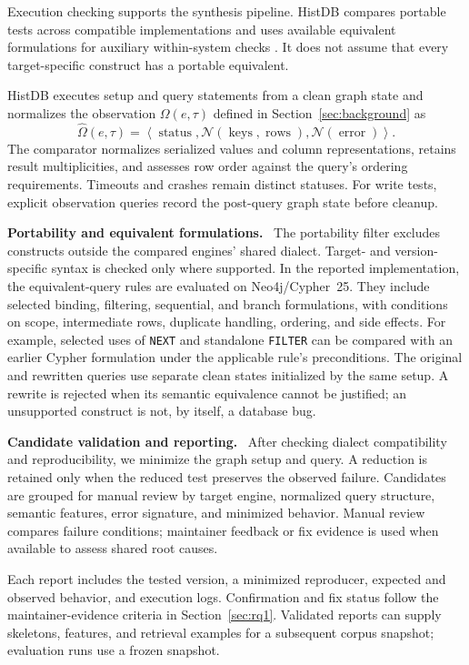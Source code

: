 \documentclass[acmsmall,screen,anonymous]{acmart}
\newcommand{\cnpara}[1]{\par\noindent\textbf{#1.}\ }
\begin{document}
Execution checking supports the synthesis pipeline. HistDB compares portable tests across compatible implementations \cite{ref40} and uses available equivalent formulations for auxiliary within-system checks \cite{ref41,ref42,ref43}. It does not assume that every target-specific construct has a portable equivalent.

HistDB executes setup and query statements from a clean graph state and normalizes the observation $\Omega(e,\tau)$ defined in Section~\ref{sec:background} as
\[
\widehat{\Omega}(e,\tau)=\left\langle
\operatorname{status},\mathcal{N}(\operatorname{keys},\operatorname{rows}),
\mathcal{N}(\operatorname{error})\right\rangle .
\]
The comparator normalizes serialized values and column representations, retains result multiplicities, and assesses row order against the query's ordering requirements. Timeouts and crashes remain distinct statuses. For write tests, explicit observation queries record the post-query graph state before cleanup.

\cnpara{Portability and equivalent formulations}
The portability filter excludes constructs outside the compared engines' shared dialect. Target- and version-specific syntax is checked only where supported. In the reported implementation, the equivalent-query rules are evaluated on Neo4j/Cypher~25. They include selected binding, filtering, sequential, and branch formulations, with conditions on scope, intermediate rows, duplicate handling, ordering, and side effects. For example, selected uses of \lstinline|NEXT| and standalone \lstinline|FILTER| can be compared with an earlier Cypher formulation under the applicable rule's preconditions. The original and rewritten queries use separate clean states initialized by the same setup. A rewrite is rejected when its semantic equivalence cannot be justified; an unsupported construct is not, by itself, a database bug.

\cnpara{Candidate validation and reporting}
After checking dialect compatibility and reproducibility, we minimize the graph setup and query. A reduction is retained only when the reduced test preserves the observed failure. Candidates are grouped for manual review by target engine, normalized query structure, semantic features, error signature, and minimized behavior. Manual review compares failure conditions; maintainer feedback or fix evidence is used when available to assess shared root causes.

Each report includes the tested version, a minimized reproducer, expected and observed behavior, and execution logs. Confirmation and fix status follow the maintainer-evidence criteria in Section~\ref{sec:rq1}. Validated reports can supply skeletons, features, and retrieval examples for a subsequent corpus snapshot; evaluation runs use a frozen snapshot.
\end{document}
